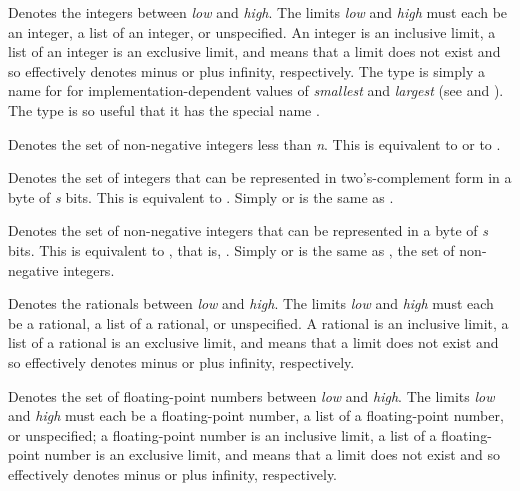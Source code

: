 \begin{flushdesc}
\item[\cd{(integer {\it low} {\it high})}]
Denotes the integers between
{\it low} and {\it high}.  The limits {\it low} and {\it high}
must each be an integer, a list of an integer, or unspecified.
An integer is an inclusive limit,
a list of an integer is an exclusive limit, and
\cd{*} means that a limit does not exist
and so effectively denotes minus or plus infinity, respectively.
The type  is simply a name
for  for implementation-dependent
values of {\it smallest} and {\it largest}
(see  and ).
The type 
is so useful that it has the special name .

\item[\cd{(mod {\it n})}]
Denotes the set of non-negative integers less than {\it n}.
This is equivalent to 
or to .

\item[\cd{(signed-byte {\it s})}]
Denotes the set of integers that can be represented
in two's-complement form in a byte of {\it s} bits.  This is
equivalent to
.
Simply  or  is the same as .

\item[\cd{(unsigned-byte {\it s})}]
Denotes the set of non-negative integers that can be
represented in a byte of {\it s} bits.  This is equivalent to , that is, .
Simply  or  is the same as
, the set of non-negative integers.

\item[\cd{(rational {\it low} {\it high})}]
Denotes the rationals between
{\it low} and {\it high}.  The limits {\it low} and {\it high}
must each be a rational, a list of a rational, or unspecified.
A rational is an inclusive limit,
a list of a rational is an exclusive limit, and
\cd{*} means that a limit does not exist
and so effectively denotes minus or plus infinity, respectively.

\item[\cd{(float {\it low} {\it high})}]
Denotes the set of floating-point numbers between
{\it low} and {\it high}.  The limits {\it low} and {\it high}
must each be a floating-point number, a list of a floating-point number,
or unspecified; a floating-point number is an inclusive limit, a list of a
floating-point number is an exclusive limit, and
\cd{*} means that a limit does not exist
and so effectively denotes minus or plus infinity, respectively.


\end{flushdesc}
